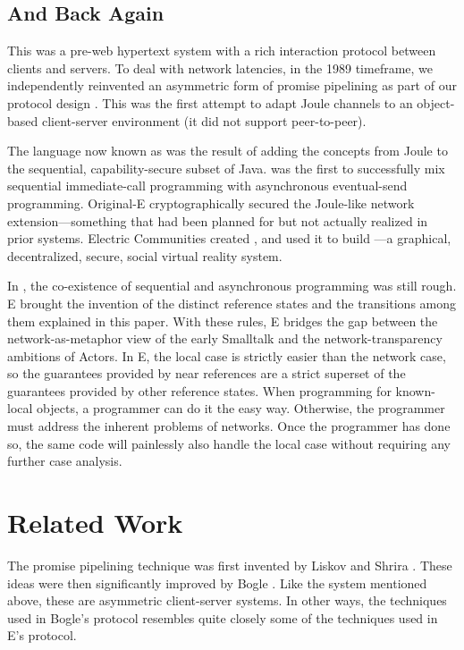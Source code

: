 \documentclass{llncs}
\begin{document}
\subsection{And Back Again}

 This was a pre-web
hypertext system with a rich interaction protocol between clients and
servers. To deal with network latencies, in the 1989 timeframe, we
independently reinvented an asymmetric form of promise pipelining as
part of our protocol design \cite{gold:promises}. This was the first
attempt to adapt Joule channels to an object-based client-server
environment (it did not support peer-to-peer). 

 The language now known as  was
the result of adding the concepts from Joule to the sequential,
capability-secure subset of Java.  was the first to
successfully mix sequential immediate-call programming with
asynchronous eventual-send programming. Original-E cryptographically
secured the Joule-like network extension---something that had been
planned for but not actually realized in prior systems.  Electric
Communities created , and used it to build
---a graphical, decentralized, secure, social virtual
reality system.

 In , the co-existence
of sequential and asynchronous programming was still rough. E brought
the invention of the distinct reference states and the transitions
among them explained in this paper. With these rules, E bridges the
gap between the network-as-metaphor view of the early Smalltalk and
the network-transparency ambitions of Actors. In E, the local case is
strictly easier than the network case, so the guarantees provided by
near references are a strict superset of the guarantees provided by
other reference states. When programming for known-local objects, a
programmer can do it the easy way. Otherwise, the programmer must
address the inherent problems of networks.  Once the programmer has
done so, the same code will painlessly also handle the local case
without requiring any further case analysis.

\section{Related Work}

 The promise
pipelining technique was first invented by Liskov and Shrira
\cite{liskov:promises}. These ideas were then significantly improved
by Bogle \cite{bogle:batched}. Like the  system
mentioned above, these are asymmetric client-server systems. In other
ways, the techniques used in Bogle's protocol resembles quite closely
some of the techniques used in E's protocol.
\end{document}
